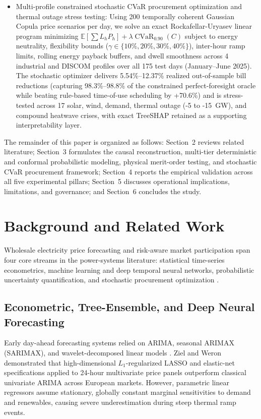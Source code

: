 \documentclass[journal,10pt,twocolumn]{IEEEtran}
\begin{document}
\begin{itemize}
    \item Multi-profile constrained stochastic CVaR procurement optimization and thermal outage stress testing: Using 200 temporally coherent Gaussian Copula price scenarios per day, we solve an exact Rockafellar-Uryasev linear program minimizing $\mathbb{E}[\sum L_h P_h] + \lambda \operatorname{CVaR}_{0.90}(C)$ subject to energy neutrality, flexibility bounds ($\gamma \in \{10\%, 20\%, 30\%, 40\%\}$), inter-hour ramp limits, rolling energy payback buffers, and dwell smoothness across 4 industrial and DISCOM profiles over all 175 test days (January--June 2025). The stochastic optimizer delivers 5.54\%--12.37\% realized out-of-sample bill reductions (capturing 98.3\%--98.8\% of the constrained perfect-foresight oracle while beating rule-based time-of-use scheduling by +70.6\%) and is stress-tested across 17 solar, wind, demand, thermal outage (-5 to -15~GW), and compound heatwave crises, with exact TreeSHAP retained as a supporting interpretability layer.
\end{itemize}

The remainder of this paper is organized as follows: Section~2 reviews related literature; Section~3 formulates the causal reconstruction, multi-tier deterministic and conformal probabilistic modeling, physical merit-order testing, and stochastic CVaR procurement framework; Section~4 reports the empirical validation across all five experimental pillars; Section~5 discusses operational implications, limitations, and governance; and Section~6 concludes the study.

\section{Background and Related Work}
Wholesale electricity price forecasting and risk-aware market participation span four core streams in the power-systems literature: statistical time-series econometrics, machine learning and deep temporal neural networks, probabilistic uncertainty quantification, and stochastic procurement optimization \cite{weron2014electricity,nowotarski2018recent,lago2021forecasting}.

\subsection{Econometric, Tree-Ensemble, and Deep Neural Forecasting}
Early day-ahead forecasting systems relied on ARIMA, seasonal ARIMAX (SARIMAX), and wavelet-decomposed linear models \cite{contreras2003arima,conejo2005day}. Ziel and Weron \cite{ziel2018day} demonstrated that high-dimensional $L_1$-regularized LASSO and elastic-net specifications applied to 24-hour multivariate price panels outperform classical univariate ARIMA across European markets. However, parametric linear regressors assume stationary, globally constant marginal sensitivities to demand and renewables, causing severe underestimation during steep thermal ramp events.
\end{document}
